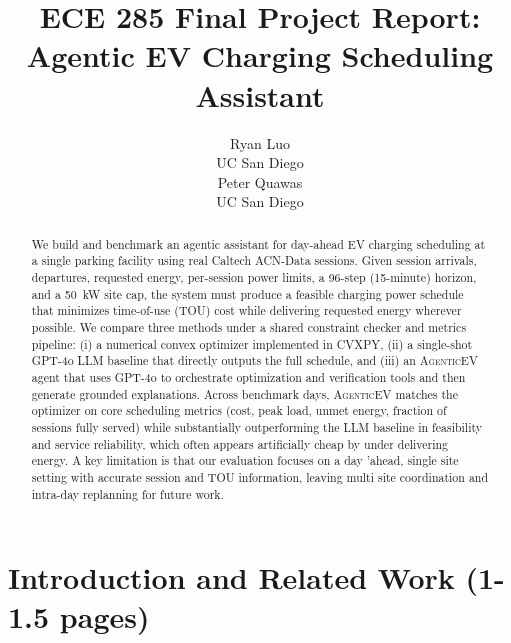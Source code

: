 \documentclass{article}
\title{ECE 285 Final Project Report: Agentic EV Charging Scheduling Assistant}
\author{
  Ryan Luo \\
  UC San Diego \\
  \And
  Peter Quawas \\
  UC San Diego \\
}
\newcommand{\modelname}{\textsc{AgenticEV}}
\begin{document}
\maketitle
\small

\noindent{}
\vspace{0.8em}

\begin{abstract}
We build and benchmark an agentic assistant for day-ahead EV charging scheduling at a single parking facility using real Caltech ACN-Data sessions. Given session arrivals, departures, requested energy, per-session power limits, a 96-step (15-minute) horizon, and a 50~kW site cap, the system must produce a feasible charging power schedule that minimizes time-of-use (TOU) cost while delivering requested energy wherever possible. We compare three methods under a shared constraint checker and metrics pipeline: (i) a numerical convex optimizer implemented in CVXPY, (ii) a single-shot GPT-4o LLM baseline that directly outputs the full schedule, and (iii) an \modelname{} agent that uses GPT-4o to orchestrate optimization and verification tools and then generate grounded explanations. Across benchmark days, \modelname{} matches the optimizer on core scheduling metrics (cost, peak load, unmet energy, fraction of sessions fully served) while substantially outperforming the LLM baseline in feasibility and service reliability, which often appears artificially cheap by under delivering energy. A key limitation is that our evaluation focuses on a day 'ahead, single site setting with accurate session and TOU information, leaving multi site coordination and intra-day replanning for future work.
\end{abstract}

\section{Introduction and Related Work (1-1.5 pages)}
\end{document}
